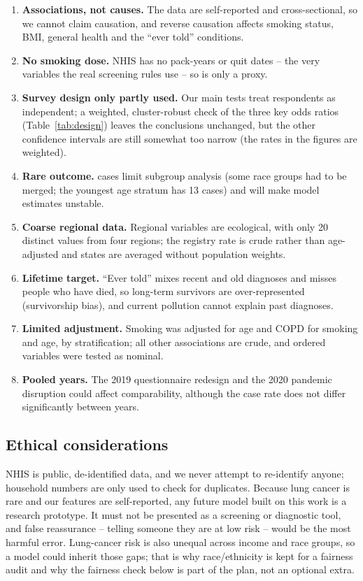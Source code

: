 \begin{enumerate}
  \item \textbf{Associations, not causes.} The data are self-reported and cross-sectional, so we cannot claim causation, and reverse causation affects smoking status, BMI, general health and the ``ever told'' conditions.
  \item \textbf{No smoking dose.} NHIS has no pack-years or quit dates -- the very variables the real screening rules use -- so  is only a proxy.
  \item \textbf{Survey design only partly used.} Our main tests treat respondents as independent; a weighted, cluster-robust check of the three key odds ratios (Table~\ref{tab:design}) leaves the conclusions unchanged, but the other confidence intervals are still somewhat too narrow (the rates in the figures are weighted).
  \item \textbf{Rare outcome.} \nCases cases limit subgroup analysis (some race groups had to be merged; the youngest age stratum has 13 cases) and will make model estimates unstable.
  \item \textbf{Coarse regional data.} Regional variables are ecological, with only 20 distinct values from four regions; the registry rate is crude rather than age-adjusted and states are averaged without population weights.
  \item \textbf{Lifetime target.} ``Ever told'' mixes recent and old diagnoses and misses people who have died, so long-term survivors are over-represented (survivorship bias), and current pollution cannot explain past diagnoses.
  \item \textbf{Limited adjustment.} Smoking was adjusted for age and COPD for smoking and age, by stratification; all other associations are crude, and ordered variables were tested as nominal.
  \item \textbf{Pooled years.} The 2019 questionnaire redesign and the 2020 pandemic disruption could affect comparability, although the case rate does not differ significantly between years.
\end{enumerate}

\subsection{Ethical considerations}\label{sec:ethics}

NHIS is public, de-identified data, and we never attempt to re-identify anyone; household numbers are only used to check for duplicates. Because lung cancer is rare and our features are self-reported, any future model built on this work is a research prototype. It must not be presented as a screening or diagnostic tool, and false reassurance -- telling someone they are at low risk -- would be the most harmful error. Lung-cancer risk is also unequal across income and race groups, so a model could inherit those gaps; that is why race/ethnicity is kept for a fairness audit and why the fairness check below is part of the plan, not an optional extra.
